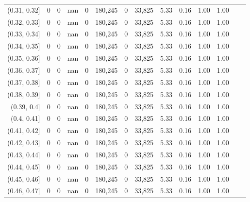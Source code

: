 \begin{tabular}{rrrrrrrrrrrrrr}
(0.31, 0.32]   &        0 &       0 &    nan &        0 &  180,245 &       0 &  33,825 &  5.33 &  0.16 &  1.00 &      1.00 \\
(0.32, 0.33]   &        0 &       0 &    nan &        0 &  180,245 &       0 &  33,825 &  5.33 &  0.16 &  1.00 &      1.00 \\
(0.33, 0.34]   &        0 &       0 &    nan &        0 &  180,245 &       0 &  33,825 &  5.33 &  0.16 &  1.00 &      1.00 \\
(0.34, 0.35]   &        0 &       0 &    nan &        0 &  180,245 &       0 &  33,825 &  5.33 &  0.16 &  1.00 &      1.00 \\
(0.35, 0.36]   &        0 &       0 &    nan &        0 &  180,245 &       0 &  33,825 &  5.33 &  0.16 &  1.00 &      1.00 \\
(0.36, 0.37]   &        0 &       0 &    nan &        0 &  180,245 &       0 &  33,825 &  5.33 &  0.16 &  1.00 &      1.00 \\
(0.37, 0.38]   &        0 &       0 &    nan &        0 &  180,245 &       0 &  33,825 &  5.33 &  0.16 &  1.00 &      1.00 \\
(0.38, 0.39]   &        0 &       0 &    nan &        0 &  180,245 &       0 &  33,825 &  5.33 &  0.16 &  1.00 &      1.00 \\
(0.39, 0.4]    &        0 &       0 &    nan &        0 &  180,245 &       0 &  33,825 &  5.33 &  0.16 &  1.00 &      1.00 \\
(0.4, 0.41]    &        0 &       0 &    nan &        0 &  180,245 &       0 &  33,825 &  5.33 &  0.16 &  1.00 &      1.00 \\
(0.41, 0.42]   &        0 &       0 &    nan &        0 &  180,245 &       0 &  33,825 &  5.33 &  0.16 &  1.00 &      1.00 \\
(0.42, 0.43]   &        0 &       0 &    nan &        0 &  180,245 &       0 &  33,825 &  5.33 &  0.16 &  1.00 &      1.00 \\
(0.43, 0.44]   &        0 &       0 &    nan &        0 &  180,245 &       0 &  33,825 &  5.33 &  0.16 &  1.00 &      1.00 \\
(0.44, 0.45]   &        0 &       0 &    nan &        0 &  180,245 &       0 &  33,825 &  5.33 &  0.16 &  1.00 &      1.00 \\
(0.45, 0.46]   &        0 &       0 &    nan &        0 &  180,245 &       0 &  33,825 &  5.33 &  0.16 &  1.00 &      1.00 \\
(0.46, 0.47]   &        0 &       0 &    nan &        0 &  180,245 &       0 &  33,825 &  5.33 &  0.16 &  1.00 &      1.00 \\

\end{tabular}
